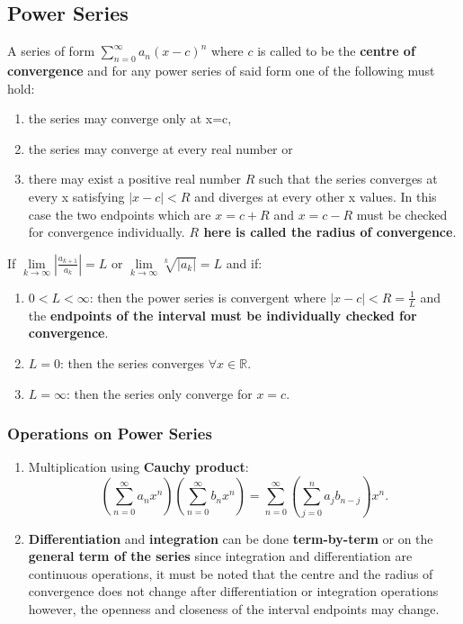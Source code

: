 \documentclass[12pt]{article}
\begin{document}
\subsection{Power Series}
A series of form $\displaystyle{\sum \limits_{n=0}^\infty a_n(x-c)^n}$ where $c$ is called to be the \textbf{centre of convergence} and for any power series of said form one of the following must hold:
\begin{enumerate}
\item the series may converge only at x=c,
\item the series may converge at every real number or
\item there may exist a positive real number $R$ such that the series converges at every x satisfying $|x-c|<R$ and diverges at every other x values. In this case the two endpoints which are $x=c+R$ and $x=c-R$ must be checked for convergence individually. \textbf{$R$ here is called the radius of convergence}. 
\end{enumerate}
If $\displaystyle{\lim \limits_{k \to \infty} \left|\frac{a_{k+1}}{a_k}\right|=L}$ or $\displaystyle{\lim \limits_{k \to \infty} \sqrt[k]{|a_k|}=L}$ and if:
\begin{enumerate}
\item $0<L<\infty$: then the power series is convergent where $\displaystyle{|x-c|<R=\frac{1}{L}}$ and the \textbf{endpoints of the interval must be individually checked for convergence}.
\item $L=0$: then the series converges $\forall x\in \mathbb{R}$.
\item $L=\infty$: then the series only converge for $x=c$.
\end{enumerate}
\subsubsection{Operations on Power Series}
\begin{enumerate}
\item Multiplication using \textbf{Cauchy product}: $$\left(\sum \limits_{n=0}^\infty a_nx^n\right) \left(\sum \limits_{n=0}^\infty b_nx^n\right) = \sum \limits_{n=0}^\infty \left( \sum \limits_{j=0}^n a_jb_{n-j}\right) x^n .$$ 
\item \textbf{Differentiation} and \textbf{integration} can be done \textbf{term-by-term} or on the \textbf{general term of the series} since integration and differentiation are continuous operations, it must be noted that the centre and the radius of convergence does not change after differentiation or integration operations however, the openness and closeness of the interval endpoints may change.
\end{enumerate}
\end{document}
